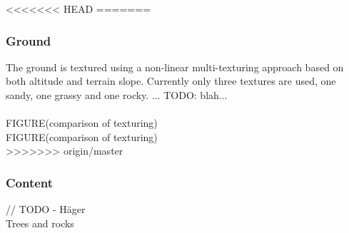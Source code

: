 <<<<<<< HEAD
=======
\subsubsection{Ground}
The ground is textured using a non-linear multi-texturing approach based on both altitude and terrain slope. Currently only three textures are used, one sandy, one grassy and one rocky. ... TODO: blah...\\
\\
FIGURE(comparison of texturing)
\\
FIGURE(comparison of texturing)
\\

>>>>>>> origin/master
\subsubsection{Content}
// TODO - Häger \\
Trees and rocks 





